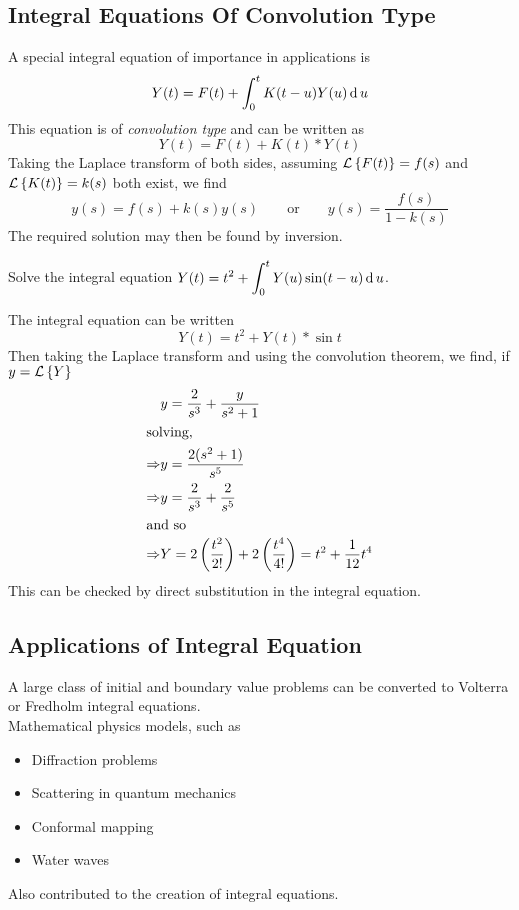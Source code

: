 \documentclass[../main-sheet.tex]{subfiles}
\begin{document}
\subsection{Integral Equations Of Convolution Type}
A special integral equation of importance in applications is
\[
    Y(t)=F(t) +\int_0^t K(t - u) Y(u) \,\mathrm{d}\, u
\]
This equation is of \emph{convolution type} and can be written as 
\[
    Y(t)=F(t) + K(t) * Y(t)
\]
Taking the Laplace transform of both sides, assuming $ \mathcal{L}\left\{ F(t)\right\} = f(s) $ and $ \mathcal{L}\left\{ K(t)\right\}=k(s) $ both exist, we find
\[
    y(s) = f (s) + k(s) y(s)\qquad \text{or}\qquad y(s) =\frac{f(s)}{1-k(s)}
\]
The required solution may then be found by inversion.
\begin{prob}
    Solve the integral equation $ \displaystyle Y(t)=t^2+\int_0^t Y(u)\sin(t-u)\,\mathrm{d}\, u $.
\end{prob}
\begin{soln}
    The integral equation can be written
    \[
        Y(t)=t^2+Y(t)*\sin t
    \]
    Then taking the Laplace transform and using the convolution theorem, we find, if $ y=\mathcal{L}\left\{ Y\right\} $
    \begin{align*}
        &y=\frac{2}{s^3}+\frac{y}{s^2+1}\\
        \intertext{solving,}
        \Rightarrow&y=\frac{2(s^2+1)}{s^5}\\
        \Rightarrow&y=\frac{2}{s^3}+\frac{2}{s^5}\\
        \intertext{and so}
        \Rightarrow&Y=2\left(\frac{t^2}{2!}\right)+2\left(\frac{t^4}{4!}\right)=t^2+\frac{1}{12}t^4
    \end{align*}
    This can be checked by direct substitution in the integral equation.
\end{soln}
\subsection{Applications of Integral Equation}
A large class of initial and boundary value problems can be converted to Volterra or Fredholm integral equations.\\
Mathematical physics models, such as
\begin{itemize}
    \item Diffraction problems
    \item Scattering in quantum mechanics
    \item Conformal mapping
    \item Water waves
\end{itemize}
Also contributed to the creation of integral equations.
\end{document}
